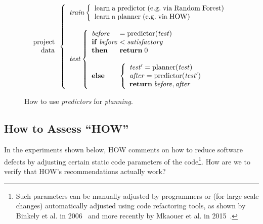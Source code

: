 \documentclass[conference]{IEEEtran}
\begin{document}
\begin{figure}[!t]
\small 
\[
\begin{array}{r}
\mathrm{project}\\
\mathrm{data}
\end{array} 
\left\{\begin{array}{l}\mathit{train}
        \left\{\begin{array}{l}
                \mathrm{learn\;a\;}\mathrm{predictor\;}\mathrm{(e.g.\;via \;Random\;Forest)}\\
                \mathrm{learn\;a\;}\mathrm{planner\;}\mathrm{(e.g.\;via \; HOW)}
              \end{array}\right.
       \\
      ~\\
\mathit{test}  
    \left\{\begin{array}{l@{~}l}
           \mathit{before}& =\mathrm{predictor}(\mathit{test})\\
           \mathrm{\bf if\;}\mathit{before} & <  \mathit{satisfactory}\\
           \mathrm{\bf then}  & \mathrm{{\bf return}\; 0}\\~\\
           \mathrm{\bf else} &
           \left\{
            \begin{array}{l}
                \mathit{test'} = \mathrm{planner}(\mathit{test})\\
                \mathit{after} =\mathrm{predictor}(\mathit{test'})\\ 
                \mathrm{{\bf return}\;} \mathit{before},\mathit{after}
            \end{array}
          \right.
   \end{array}\right.
\end{array} \right. 
\]
 
\caption{How to use {\em predictors} for {\em planning}.}\label{fig:work}
\end{figure}



\subsection{How to Assess ``HOW''}\label{sect:assess}
In the experiments shown below,  HOW comments  on how to reduce
software defects by adjusting certain static code parameters of the code\footnote{Such parameters can be manually adjusted by programmers or (for large scale changes) automatically adjusted using code refactoring
tools, as shown by Binkely et al. in 2006~\cite{Binkley2006} and more recently by Mkaouer et al. in 2015~\cite{Mkaouer15}.}. How are we to verify that HOW's recommendations actually work? 
\end{document}
